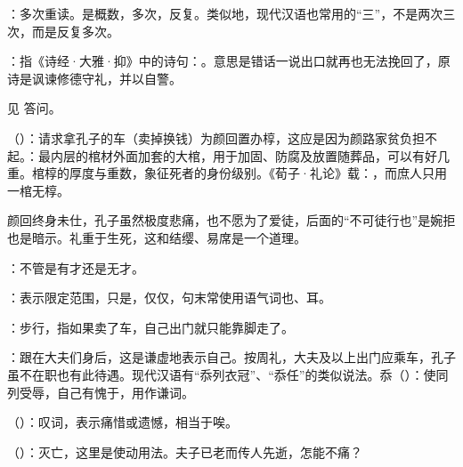 {
\item {}：多次重读。是概数，多次，反复。类似地，现代汉语也常用的“三”，不是两次三次，而是反复多次。
\item {}：指《诗经·大雅·抑》中的诗句：。意思是错话一说出口就再也无法挽回了，原诗是讽谏修德守礼，并以自警。
}
{}


{见  答问。}
{}


{
\item {}（）：请求拿孔子的车（卖掉换钱）为颜回置办椁，这应是因为颜路家贫负担不起。：最内层的棺材外面加套的大棺，用于加固、防腐及放置随葬品，可以有好几重。棺椁的厚度与重数，象征死者的身份级别。《荀子·礼论》载：，而庶人只用一棺无椁。

颜回终身未仕，孔子虽然极度悲痛，也不愿为了爱徒，后面的“不可徒行也”是婉拒也是暗示。礼重于生死，这和结缨、易席是一个道理。
\item {}：不管是有才还是无才。
\item {}：表示限定范围，只是，仅仅，句末常使用语气词也、耳。
\item {}：步行，指如果卖了车，自己出门就只能靠脚走了。
\item {}：跟在大夫们身后，这是谦虚地表示自己。按周礼，大夫及以上出门应乘车，孔子虽不在职也有此待遇。现代汉语有“忝列衣冠”、“忝任”的类似说法。忝（）：使同列受辱，自己有愧于，用作谦词。
}
{}


{
\item {}（）：叹词，表示痛惜或遗憾，相当于唉。
\item {}（）：灭亡，这里是使动用法。夫子已老而传人先逝，怎能不痛？ %
}
{}


